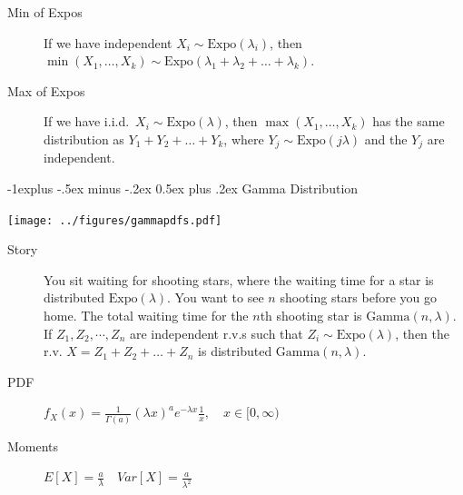 \documentclass[10pt,landscape]{article}
\makeatletter
\newcommand{\Gam}{\textrm{Gamma}}
\newcommand{\Expo}{\textrm{Expo}}
\renewcommand{\subsection}{\@startsection{subsection}{2}{0mm}%
{-1explus -.5ex minus -.2ex}%
{0.5ex plus .2ex}%
{\normalfont\normalsize\bfseries}}
\makeatother
\begin{document}
\begin{multicols*}{3}
\begin{description}

            \item[Min of Expos] If we have independent $X_i \sim \Expo(\lambda_i)$, then $\min(X_1, \dots, X_k) \sim \Expo(\lambda_1 + \lambda_2 + \dots + \lambda_k)$.
            \item[Max of Expos] If we have i.i.d.~$X_i \sim \Expo(\lambda)$, then $\max(X_1, \dots, X_k)$ has the same distribution as $Y_1+Y_2+\dots+Y_k$, where $Y_j \sim \Expo(j\lambda)$ and the $Y_j$ are independent.
        \end{description}

        \subsection{Gamma Distribution}
        \begin{minipage}{\linewidth}
            \centering
            \texttt{[image: ../figures/gammapdfs.pdf]}
        \end{minipage}
        \begin{description}
            \item[Story] You sit waiting for shooting stars, where the waiting time for a star is distributed $\Expo(\lambda)$. You want to see $n$ shooting stars before you go home. The total waiting time for the $n$th shooting star is $\Gam(n,\lambda)$. If $Z_1,Z_2,\cdots,Z_n$ are independent r.v.s such that $Z_i \sim \Expo(\lambda)$, then the r.v. $X = Z_1 + Z_2 + \dots + Z_n$ is distributed $\Gam(n, \lambda)$.
            \item[PDF] $f_X(x) = \frac{1}{\Gamma(a)}(\lambda x)^ae^{-\lambda x}\frac{1}{x}, \quad x \in [0, \infty)$
            \item[Moments] $E[X] = \frac{a}{\lambda} \quad Var[X] = \frac{a}{\lambda^2}$


\end{description}
\end{multicols*}
\end{document}
